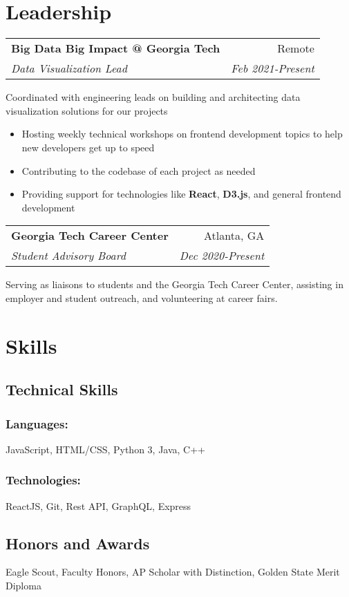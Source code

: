 \documentclass[letterpaper,8pt]{article}
\makeatletter
\newcommand{\resumeSubheading}[4]{
  \vspace{0.25em}
  \begin{tabular*}{1\textwidth}[t]{l@{\extracolsep{\fill}}r}
    \textbf{#1} & #2 \\
    \textit{#3} & \textit{#4} \\
  \end{tabular*}\vspace{-5pt}
}
\makeatother
\begin{document}
\section{Leadership}
\resumeSubheading{Big Data Big Impact @ Georgia Tech}{Remote}{Data Visualization Lead}{Feb 2021-Present}

Coordinated with engineering leads on building and architecting data visualization solutions for our projects

\begin{itemize}[label=\raisebox{0.25ex}{\tiny$\bullet$}]
    \item Hosting weekly technical workshops on frontend development topics to help new developers get up to speed
    \item Contributing to the codebase of each project as needed
    \item Providing support for technologies like \textbf{React}, \textbf{D3.js}, and general frontend development
\end{itemize}
\vspace{3pt}


\resumeSubheading{Georgia Tech Career Center}{Atlanta, GA}{Student Advisory Board}{Dec 2020-Present}

Serving as liaisons to students and the Georgia Tech Career Center, assisting in employer and student outreach, and volunteering at career fairs.
\section{Skills}

\begin{multicols}{2}
\subsection{Technical Skills}

\subsubsection{Languages:}

JavaScript, HTML/CSS, Python 3, Java, C++

\subsubsection{Technologies:}

ReactJS, Git, Rest API, GraphQL, Express

\columnbreak


\subsection{Honors and Awards}
Eagle Scout, Faculty Honors, AP Scholar with Distinction, Golden State Merit Diploma

\end{multicols}
\end{document}
